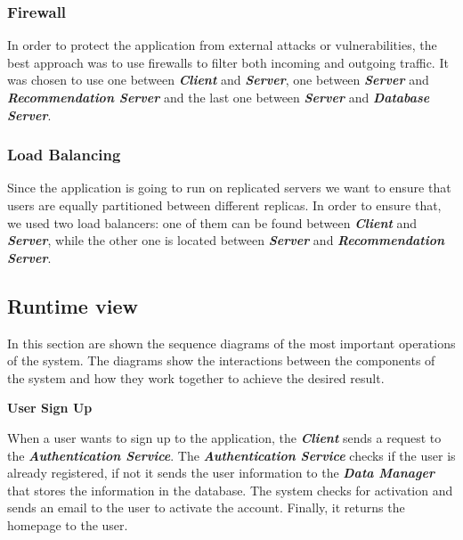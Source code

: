 \documentclass{article}
\begin{document}
\newpage

\subsubsection{Firewall}
In order to protect the application from external attacks or vulnerabilities, the best approach was to use firewalls to filter both incoming and outgoing traffic. It was chosen to use one between \textbf{\textit{Client}} and \textbf{\textit{Server}}, one between \textbf{\textit{Server}} and \textbf{\textit{Recommendation Server}} and the last one between \textbf{\textit{Server}} and \textbf{\textit{Database Server}}.

\subsubsection{Load Balancing}
Since the application is going to run on replicated servers we want to ensure that users are equally partitioned between different replicas. In order to ensure that, we used two load balancers: one of them can be found between \textbf{\textit{Client}} and \textbf{\textit{Server}}, while the other one is located between \textbf{\textit{Server}} and \textbf{\textit{Recommendation Server}}.

\newpage

\subsection{Runtime view}

In this section are shown the sequence diagrams of the most important operations of the system. The diagrams show the interactions between the components of the system and how they work together to achieve the desired result.

\newpage

\begin{flushleft}
    \textbf{\large{User Sign Up}}
\end{flushleft}

When a user wants to sign up to the application, the \textbf{\textit{Client}} sends a request to the \textbf{\textit{Authentication Service}}. The \textbf{\textit{Authentication Service}} checks if the user is already registered, if not it sends the user information to the \textbf{\textit{Data Manager}} that stores the information in the database. The system checks for activation and sends an email to the user to activate the account. Finally, it returns the homepage to the user.
\end{document}
